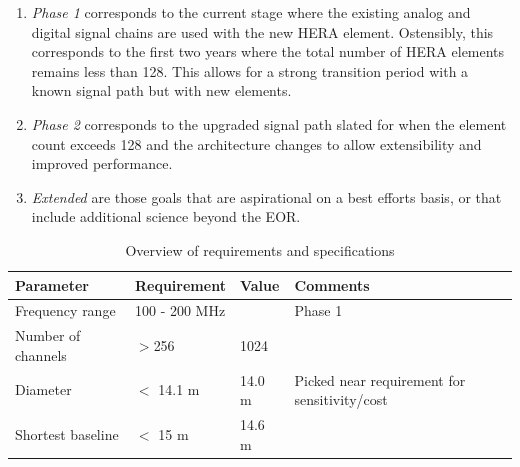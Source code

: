 \documentclass{article}
\begin{document}
\begin{enumerate}
\item {\em Phase 1} corresponds to the current stage where the existing analog and digital signal chains are used with the new HERA element.  Ostensibly, this corresponds to the first two years where the total number of HERA elements remains less than 128.  This allows for a strong transition period with a known signal path but with new elements.
\item {\em Phase 2} corresponds to the upgraded signal path slated for when the element count exceeds 128 and the architecture changes to allow extensibility and improved performance.
\item {\em Extended} are those goals that are aspirational on a best efforts basis, or that include additional science beyond the EOR.
\end{enumerate}

\begin{table}
\label{tab:specs}
\caption{Overview of requirements and specifications}
\begin{tabular}{| l | l | l | p{5cm} |}\hline
{\bf Parameter} & {\bf Requirement} & {\bf Value} & {\bf Comments} \\ \hline
Frequency range & 100 - 200 MHz & & Phase 1 \\ \hline
Number of channels & $>$256 & 1024 & \\ \hline
Diameter    & $<$ 14.1 m &  14.0 m & Picked near requirement for sensitivity/cost \\ \hline
Shortest baseline & $<$ 15 m & 14.6 m & \\ \hline
\end{tabular}
\end{table}
\end{document}
